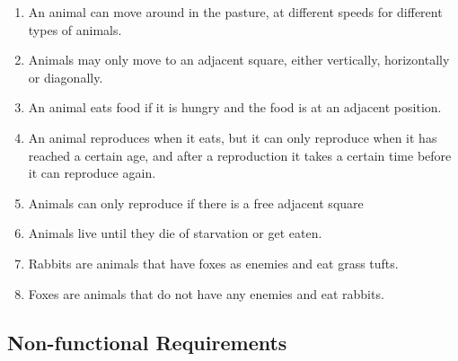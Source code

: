 \documentclass[12pt]{article}
\begin{document}
\begin{enumerate}
\begin{enumerate}
  \item An animal can move around in the pasture, at different speeds for different types of animals.

  \item Animals may only move to an adjacent square, either vertically, horizontally or diagonally.

  \item An animal eats food if it is hungry and the food is at an adjacent position.

  \item An animal reproduces when it eats, but it can only reproduce when it has reached a certain age, and after a reproduction it takes a certain time before it can reproduce again.

  \item Animals can only reproduce if there is a free adjacent square

  \item Animals live until they die of starvation or get eaten.

  \item Rabbits are animals that have foxes as enemies and eat grass tufts.

  \item Foxes are animals that do not have any enemies and eat rabbits.
  \end{enumerate}

\end{enumerate}

\subsection{Non-functional Requirements}
\end{document}
